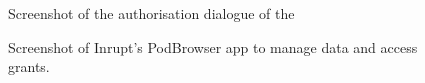 \begin{figure}[htp]
    \caption[Screenshots of the authorisation dialogues of existing Solid servers (CSS and ESS).]{Screenshot of the authorisation dialogue of the}
    \label{fig:authorisation-dialogue}
    \centering
    \qquad
\end{figure}

\begin{figure}[htp]
    \centering
    \caption{Screenshot of Inrupt's PodBrowser app to manage data and access grants.}
    \label{fig:podbrowser}
\end{figure}

